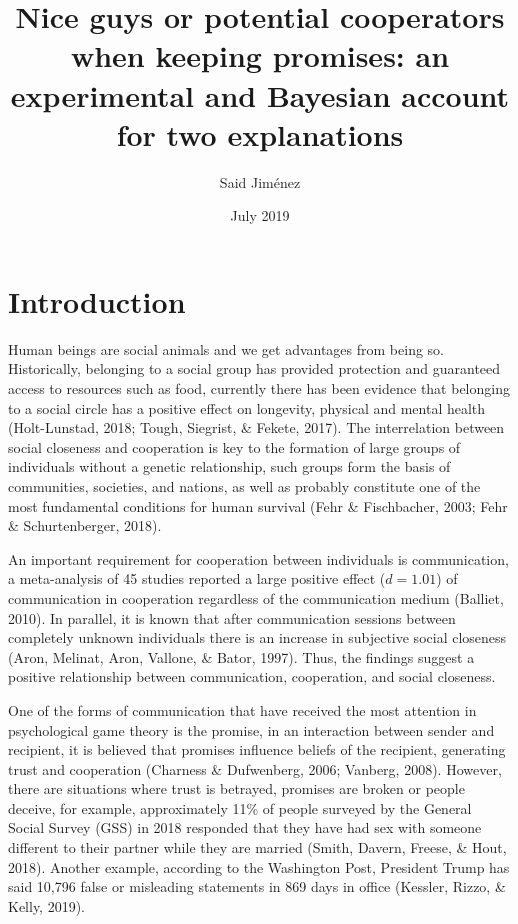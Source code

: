 \documentclass[12pt,]{article}
\title{Nice guys or potential cooperators when keeping promises: an
experimental and Bayesian account for two explanations}
\author{Said Jiménez}
\date{July 2019}
\begin{document}
\maketitle

\hypertarget{introduction}{%
\section{Introduction}\label{introduction}}

Human beings are social animals and we get advantages from being so.
Historically, belonging to a social group has provided protection and
guaranteed access to resources such as food, currently there has been
evidence that belonging to a social circle has a positive effect on
longevity, physical and mental health (Holt-Lunstad, 2018; Tough,
Siegrist, \& Fekete, 2017). The interrelation between social closeness
and cooperation is key to the formation of large groups of individuals
without a genetic relationship, such groups form the basis of
communities, societies, and nations, as well as probably constitute one
of the most fundamental conditions for human survival (Fehr \&
Fischbacher, 2003; Fehr \& Schurtenberger, 2018).

An important requirement for cooperation between individuals is
communication, a meta-analysis of 45 studies reported a large positive
effect (\(d = 1.01\)) of communication in cooperation regardless of the
communication medium (Balliet, 2010). In parallel, it is known that
after communication sessions between completely unknown individuals
there is an increase in subjective social closeness (Aron, Melinat,
Aron, Vallone, \& Bator, 1997). Thus, the findings suggest a positive
relationship between communication, cooperation, and social closeness.

One of the forms of communication that have received the most attention
in psychological game theory is the promise, in an interaction between
sender and recipient, it is believed that promises influence beliefs of
the recipient, generating trust and cooperation (Charness \& Dufwenberg,
2006; Vanberg, 2008). However, there are situations where trust is
betrayed, promises are broken or people deceive, for example,
approximately 11\% of people surveyed by the General Social Survey (GSS)
in 2018 responded that they have had sex with someone different to their
partner while they are married (Smith, Davern, Freese, \& Hout, 2018).
Another example, according to the Washington Post, President Trump has
said 10,796 false or misleading statements in 869 days in office
(Kessler, Rizzo, \& Kelly, 2019).
\end{document}
